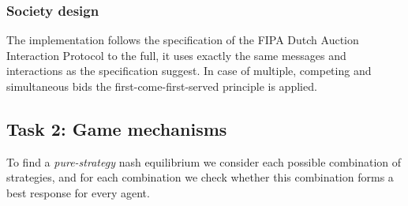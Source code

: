 \documentclass[a4paper, 11pt]{article}
\begin{document}
\subsubsection*{Society design}
The implementation follows the specification of the FIPA Dutch Auction Interaction Protocol \citep{fipa_dutch} to the full, it uses exactly the same messages and interactions as the specification suggest. In case of multiple, competing and simultaneous bids the first-come-first-served principle is applied.
\subsection*{Task 2: Game mechanisms}
To find a \textit{pure-strategy} nash equilibrium we consider each possible combination of strategies, and for each combination we check whether this combination forms a best response for every agent.
\end{document}
